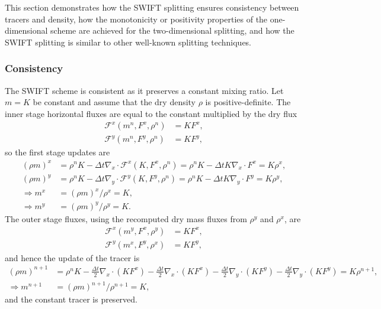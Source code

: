 \documentclass{ametsocV6.1}
\begin{document}
This section demonstrates how the SWIFT splitting ensures consistency between tracers and density, how the monotonicity or positivity properties of the one-dimensional scheme are achieved for the two-dimensional splitting, and how the SWIFT splitting is similar to other well-known splitting techniques. 

\subsubsection{Consistency}

The SWIFT scheme is consistent as it preserves a constant mixing ratio. Let $m=K$ be constant and assume that the dry density $\rho$ is positive-definite. The inner stage horizontal fluxes are equal to the constant multiplied by the dry flux
\begin{subequations}
\begin{align}   
   \mathcal{F}^x(m^n,F^{x},\rho^n) &= K F^x, \\
   \mathcal{F}^y(m^n,F^{y},\rho^n) &= K F^y,
\end{align}
\end{subequations}
so the first stage updates are
\begin{subequations}
\begin{align}        
    (\rho m)^x &=\rho^n K - \Delta{t} \nabla_x\cdot \mathcal{F}^x(K,F^{x},\rho^n) = \rho^n K - \Delta{t} K \nabla_x\cdot F^x = K \rho^x, \\
    (\rho m)^y &=\rho^n K - \Delta{t} \nabla_y\cdot \mathcal{F}^y(K,F^{y},\rho^n) = \rho^n K - \Delta{t} K \nabla_y\cdot F^y = K \rho^y, \\
    \Rightarrow m^x &= (\rho m)^x / \rho^x = K, \\
    \Rightarrow m^y &= (\rho m)^y / \rho^y = K.
\end{align}
\end{subequations}
The outer stage fluxes, using the recomputed dry mass fluxes from $\rho^y$ and $\rho^x$, are
\begin{subequations}
\begin{align}
    \mathcal{F}^x(m^y,F^{x},\rho^y) & = K F^x, \\
    \mathcal{F}^y(m^x,F^{y},\rho^x) & = K F^y,
\end{align}
\end{subequations}
 and hence the update of the tracer is
 \begin{subequations}
\begin{align}
    (\rho m)^{n+1} &= \rho^n K -\frac{\Delta{t}}{2}\nabla_x\cdot (K F^x) -\frac{\Delta{t}}{2}\nabla_x\cdot (K F^x) -\frac{\Delta{t}}{2}\nabla_y\cdot (K F^y) -\frac{\Delta{t}}{2}\nabla_y\cdot (K F^y) = K \rho^{n+1}, \\
    \Rightarrow m^{n+1} &=  (\rho m)^{n+1}/ \rho^{n+1} = K,
\end{align}
\end{subequations}
and the constant tracer is preserved.
\end{document}
